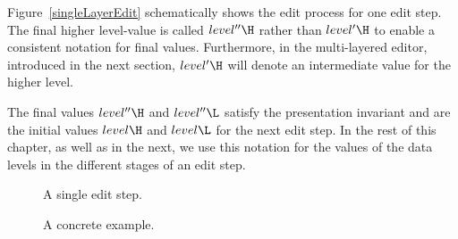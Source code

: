 Figure~\ref{singleLayerEdit} schematically shows the edit process for one edit step.  The final higher level-value is called $level''\H$ rather than $level'\H$ to enable a consistent notation for final values. Furthermore, in the multi-layered editor, introduced in the next section, $level'\H$ will denote an intermediate value for the higher level.

The final values $level''\H$ and $level''\L$ satisfy the presentation invariant and are the initial values $level\H$ and $level\L$ for the next edit step. In the rest of this chapter, as well as in the next, we use this notation for the values of the data levels in the different stages of an edit step.

\begin{figure}[h]
  \hfill
  \begin{minipage}[b]{.45\textwidth}
    \begin{center}   
      \caption{A single edit step.} \label{singleLayerEdit}  %
    \end{center}
  \end{minipage}
  \hfill
  \begin{minipage}[b]{.45\textwidth}
    \begin{center}  
      \caption{A concrete example.} \label{singleLayerEditExample} %
    \end{center}
  \end{minipage}
  \hfill
\end{figure}

%


